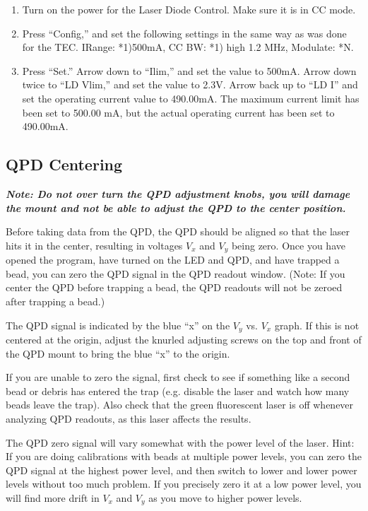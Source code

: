 \documentclass{../lab}
\begin{document}
\begin{enumerate}
    \item Turn on the power for the Laser Diode Control. Make sure it is in CC mode.

    \item Press ``Config,'' and set the following settings in the same way as was done for the TEC. IRange: *1)500mA, CC BW: *1) high 1.2 MHz, Modulate: *N.

    \item Press ``Set.'' Arrow down to ``Ilim,'' and set the value to 500mA. Arrow down twice to ``LD Vlim,'' and set the value to 2.3V. Arrow back up to ``LD I'' and set the operating current value to 490.00mA. The maximum current limit has been set to 500.00 mA, but the actual operating current has been set to 490.00mA.
\end{enumerate}

\subsection{QPD Centering}

\emph{\textbf{Note: Do not over turn the QPD adjustment knobs, you will damage the mount and not be able to adjust the QPD to the center position.}}

Before taking data from the QPD, the QPD should be aligned so that the laser hits it in the center, resulting in voltages $V_x$ and $V_y$ being zero. Once you have opened the program, have turned on the LED and QPD, and have trapped a bead, you can zero the QPD signal in the QPD readout window. (Note: If you center the QPD before trapping a bead, the QPD readouts will not be zeroed after trapping a bead.)

The QPD signal is indicated by the blue ``x'' on the $V_y$ vs. $V_x$ graph. If this is not centered at the origin, adjust the knurled adjusting screws on the top and front of the QPD mount to bring the blue ``x'' to the origin.

If you are unable to zero the signal, first check to see if something like a second bead or debris has entered the trap (e.g. disable the laser and watch how many beads leave the trap). Also check that the green fluorescent laser is off whenever analyzing QPD readouts, as this laser affects the results.

The QPD zero signal will vary somewhat with the power level of the laser. Hint: If you are doing calibrations with beads at multiple power levels, you can zero the QPD signal at the highest power level, and then switch to lower and lower power levels without too much problem. If you precisely zero it at a low power level, you will find more drift in $V_x$ and $V_y$ as you move to higher power levels.
\end{document}

